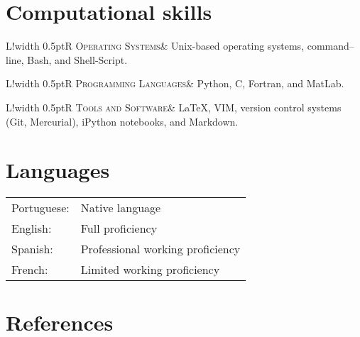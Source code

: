 \documentclass[10pt]{article}
\newcommand\VRule{\color{lightgray}\vrule width 0.5pt}
\begin{document}
\section*{Computational skills}
\vspace{.3cm}
\begin{tabular}{L!{\VRule}R}
\textsc{Operating Systems}& Unix-based 
operating systems, command--line, Bash, and Shell-Script. \\
\end{tabular}
\newline \noindent 
\newline \noindent
\begin{tabular}{L!{\VRule}R}
\textsc{Programming Languages}& Python, C, Fortran, and MatLab.  \\
\end{tabular}
\newline \noindent 
\newline \noindent
\begin{tabular}{L!{\VRule}R}
\textsc{Tools and Software}& LaTeX, VIM, version control systems (Git, Mercurial), iPython notebooks, and Markdown. \\
\end{tabular}

\vspace{.5cm}
\section*{Languages}
\vspace{.3cm}
\begin{tabular}{l l}
Portuguese: & Native language\\[3pt]
English:& Full proficiency\\[3pt] 
Spanish: & Professional working proficiency \\[3pt]
French:& Limited working proficiency \\
\end{tabular}

\vspace{.5cm}
\section*{References}
\vspace{.3cm}
\end{document}

